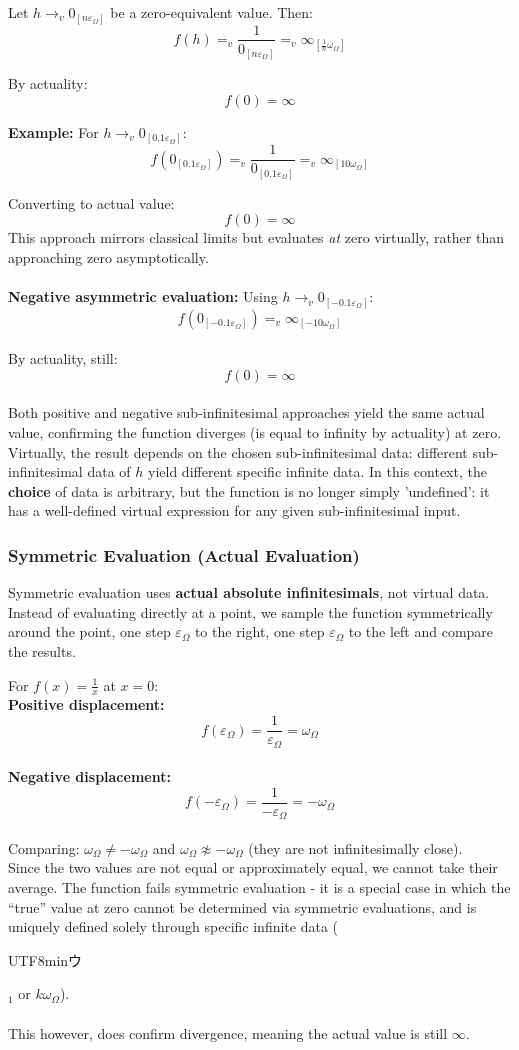 \documentclass{article}
\newcommand{\U}{\begin{CJK}{UTF8}{min}ウ\end{CJK}}
\begin{document}
Let $h \to_v 0_{[n\varepsilon_\Omega]}$ be a zero-equivalent value. Then:
$$f(h) =_v \frac{1}{0_{[n\varepsilon_\Omega]}} =_v \infty_{[\frac{1}{n}\omega_\Omega]}$$

By actuality:
$$f(0) = \infty$$

\textbf{Example:} For $h \to_v 0_{[0.1\varepsilon_\Omega]}$:
$$f(0_{[0.1\varepsilon_\Omega]}) =_v \frac{1}{0_{[0.1\varepsilon_\Omega]}} =_v \infty_{[10\omega_\Omega]}$$

Converting to actual value:
$$f(0) = \infty$$This approach mirrors classical limits but evaluates \textit{at} zero virtually, rather than approaching zero asymptotically.\\\\\textbf{Negative asymmetric evaluation:} Using $h \to_v 0_{[-0.1\varepsilon_\Omega]}$:
$$f(0_{[-0.1\varepsilon_\Omega]}) =_v \infty_{[-10\omega_\Omega]}$$\\By actuality, still:
$$f(0) = \infty$$\\Both positive and negative sub-infinitesimal approaches yield the same actual value, confirming the function diverges (is equal to infinity by actuality) at zero. Virtually, the result depends on the chosen sub-infinitesimal data: different sub-infinitesimal data of $h$ yield different specific infinite data. In this context, the \textbf{choice} of data is arbitrary, but the function is no longer simply 'undefined': it has a well-defined virtual expression for any given sub-infinitesimal input.

\subsubsection{Symmetric Evaluation (Actual Evaluation)}

Symmetric evaluation uses \textbf{actual absolute infinitesimals}, not virtual data. Instead of evaluating directly at a point, we sample the function symmetrically around the point, one step $\varepsilon_\Omega$ to the right, one step $\varepsilon_\Omega$ to the left and compare the results.

For $f(x) = \frac{1}{x}$ at $x = 0$:\\\textbf{Positive displacement:}
$$f(\varepsilon_\Omega) = \frac{1}{\varepsilon_\Omega} = \omega_\Omega$$\\\textbf{Negative displacement:}
$$f(-\varepsilon_\Omega) = \frac{1}{-\varepsilon_\Omega} = -\omega_\Omega$$\\Comparing: $\omega_\Omega \neq -\omega_\Omega$ and $\omega_\Omega \not\approx -\omega_\Omega$ (they are not infinitesimally close).\\Since the two values are not equal or approximately equal, we cannot take their average. The function fails symmetric evaluation - it is a special case in which the ``true'' value at zero cannot be determined via symmetric evaluations, and is uniquely defined solely through specific infinite data (\U$_1$ or $k\omega_\Omega$).\\\\This however, does confirm divergence, meaning the actual value is still $\infty$.
\end{document}
